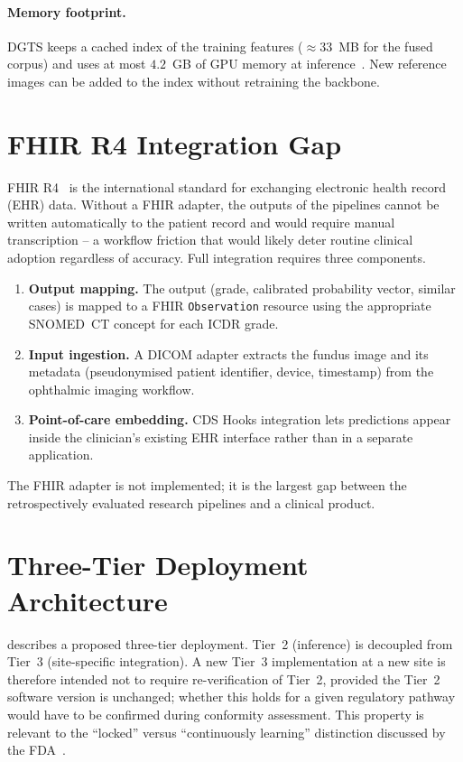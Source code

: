 \paragraph{Memory footprint.}
DGTS keeps a cached index of the training features ($\approx33$~MB for the fused corpus)
and uses at most $4.2$~GB of GPU memory at inference~\cite{belhadj2026dgts}. New reference
images can be added to the index without retraining the backbone.

\section{FHIR R4 Integration Gap}
\label{sec:fhir}

FHIR R4~\cite{hl7fhir} is the international standard for exchanging electronic health
record (EHR) data. Without a FHIR adapter, the outputs of the pipelines cannot be written
automatically to the patient record and would require manual transcription -- a workflow
friction that would likely deter routine clinical adoption regardless of accuracy. Full
integration requires three components.
\begin{enumerate}
\item \textbf{Output mapping.} The output (grade, calibrated probability vector, similar
cases) is mapped to a FHIR \texttt{Observation} resource using the appropriate SNOMED~CT
concept for each ICDR grade.
\item \textbf{Input ingestion.} A DICOM adapter extracts the fundus image and its metadata
(pseudonymised patient identifier, device, timestamp) from the ophthalmic imaging
workflow.
\item \textbf{Point-of-care embedding.} CDS Hooks integration lets predictions appear
inside the clinician's existing EHR interface rather than in a separate application.
\end{enumerate}
The FHIR adapter is not implemented; it is the largest gap between the retrospectively
evaluated research pipelines and a clinical product.

\section{Three-Tier Deployment Architecture}
\label{sec:tiers}

 describes a proposed three-tier deployment. Tier~2 (inference) is decoupled from Tier~3 (site-specific integration). A new Tier~3
implementation at a new site is therefore intended not to require re-verification of
Tier~2, provided the Tier~2 software version is unchanged; whether this holds for a given
regulatory pathway would have to be confirmed during conformity assessment. This property is relevant to the ``locked''
versus ``continuously learning'' distinction discussed by the
FDA~\cite{fda2017samd,fda2019aiml}.


